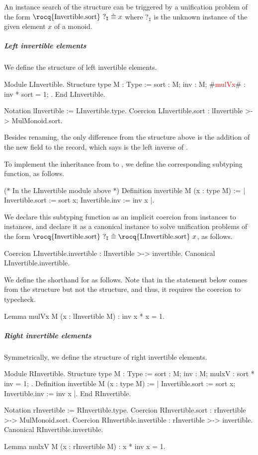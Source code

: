 \documentclass[a4paper,UKenglish,cleveref,autoref]{lipics-v2021}
\newcommand\conveq{\equiv}
\newcommand\unify{\ensuremath{\mathrel{\hat{\conveq}}}}
\newcommand\evar[1]{\ensuremath{?_{\texttt{#1}}}}
\begin{document}
An instance search of the  structure can be triggered by a unification problem of
the form $\text{\rocq{Invertible.sort}} ~ \evar{I} \unify x$ where \evar{I} is the unknown
 instance of the given element $x$ of a monoid.

\subparagraph{Left invertible elements}
We define the structure of left invertible elements.
\begin{rocqcode}
Module LInvertible.
Structure type M : Type := { sort : M; inv : M; #\textcolor{red}{mulVx}# : inv * sort = 1; }.
End LInvertible.

Notation lInvertible := LInvertible.type.
Coercion LInvertible.sort : lInvertible >-> MulMonoid.sort.
\end{rocqcode}
Besides renaming, the only difference from the  structure above is the addition of
the new field  to the  record, which says  is the left inverse of
.

To implement the inheritance from  to , we define the
corresponding subtyping function, as follows.
\begin{rocqcode}
(* In the \textup{LInvertible} module above *)
Definition invertible M (x : type M) :=
  {| Invertible.sort := sort x; Invertible.inv := inv x |}.
\end{rocqcode}
We declare this subtyping function as an implicit coercion from  instances to
 instances, and declare it as a canonical instance to solve unification problems of
the form $\text{\rocq{Invertible.sort}} ~ \evar{I} \unify \text{\rocq{LInvertible.sort}} ~ x$, as
follows.
\begin{rocqcode}
Coercion LInvertible.invertible : lInvertible >-> invertible.
Canonical LInvertible.invertible.
\end{rocqcode}

We define the shorthand  for  as follows. Note that 
in the statement below comes from the  structure but not the 
structure, and thus, it requires the  coercion to typecheck.
\begin{rocqcode}
Lemma mulVx {M} (x : lInvertible M) : inv x * x = 1.
\end{rocqcode}

\subparagraph{Right invertible elements}
Symmetrically, we define the structure of right invertible elements.
\begin{rocqcode}
Module RInvertible.
Structure type M : Type := { sort : M; inv : M; mulxV : sort * inv = 1; }.
Definition invertible M (x : type M) :=
  {| Invertible.sort := sort x; Invertible.inv := inv x |}.
End RInvertible.

Notation rInvertible := RInvertible.type.
Coercion RInvertible.sort : rInvertible >-> MulMonoid.sort.
Coercion RInvertible.invertible : rInvertible >-> invertible.
Canonical RInvertible.invertible.

Lemma mulxV {M} (x : rInvertible M) : x * inv x = 1.
\end{rocqcode}
\end{document}
